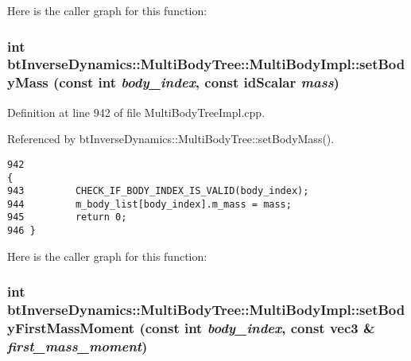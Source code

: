 Here is the caller graph for this function:\hypertarget{classbt_inverse_dynamics_1_1_multi_body_tree_1_1_multi_body_impl_39c5abc3579669646d6c669a7e86032e}{
\subsubsection[setBodyMass]{\setlength{\rightskip}{0pt plus 5cm}int btInverseDynamics::MultiBodyTree::MultiBodyImpl::setBodyMass (const int {\em body\_\-index}, \/  const idScalar {\em mass})}}
\label{classbt_inverse_dynamics_1_1_multi_body_tree_1_1_multi_body_impl_39c5abc3579669646d6c669a7e86032e}


 

Definition at line 942 of file MultiBodyTreeImpl.cpp.

Referenced by btInverseDynamics::MultiBodyTree::setBodyMass().

\begin{Code}\begin{verbatim}942                                                                                      {
943         CHECK_IF_BODY_INDEX_IS_VALID(body_index);
944         m_body_list[body_index].m_mass = mass;
945         return 0;
946 }
\end{verbatim}
\end{Code}




Here is the caller graph for this function:\hypertarget{classbt_inverse_dynamics_1_1_multi_body_tree_1_1_multi_body_impl_bf4ba386bf4546e4bf05588d46cd82b5}{
\subsubsection[setBodyFirstMassMoment]{\setlength{\rightskip}{0pt plus 5cm}int btInverseDynamics::MultiBodyTree::MultiBodyImpl::setBodyFirstMassMoment (const int {\em body\_\-index}, \/  const {\bf vec3} \& {\em first\_\-mass\_\-moment})}}
\label{classbt_inverse_dynamics_1_1_multi_body_tree_1_1_multi_body_impl_bf4ba386bf4546e4bf05588d46cd82b5}


